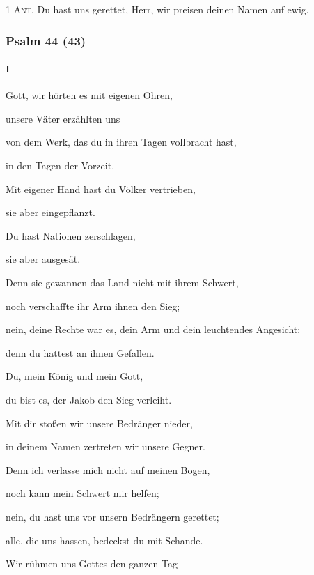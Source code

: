 \noindent \textsc{1 Ant.} Du hast uns gerettet, Herr, wir preisen deinen Namen auf ewig.

\subsubsection{Psalm 44 (43)} \paragraph{I}

\noindent Gott, wir hörten es mit eigenen Ohren,~\GreStar{}~\nopagebreak

unsere Väter erzählten uns

\noindent von dem Werk, das du in ihren Tagen vollbracht hast,~\GreStar{}~\nopagebreak

in den Tagen der Vorzeit.

\noindent Mit eigener Hand hast du Völker vertrieben,~\GreStar{}~\nopagebreak

sie aber eingepflanzt.

\noindent Du hast Nationen zerschlagen,~\GreStar{}~\nopagebreak

sie aber ausgesät.

\noindent Denn sie gewannen das Land nicht mit ihrem Schwert,~\GreStar{}~\nopagebreak

noch verschaffte ihr Arm ihnen den Sieg;

\noindent nein, deine Rechte war es, dein Arm und dein leuchtendes Angesicht;~\GreStar{}~\nopagebreak

denn du hattest an ihnen Gefallen.

\noindent Du, mein König und mein Gott,~\GreStar{}~\nopagebreak

du bist es, der Jakob den Sieg verleiht.

\noindent Mit dir stoßen wir unsere Bedränger nieder,~\GreStar{}~\nopagebreak

in deinem Namen zertreten wir unsere Gegner.

\noindent Denn ich verlasse mich nicht auf meinen Bogen,~\GreStar{}~\nopagebreak

noch kann mein Schwert mir helfen;

\noindent nein, du hast uns vor unsern Bedrängern gerettet;~\GreStar{}~\nopagebreak

alle, die uns hassen, bedeckst du mit Schande.

\noindent Wir rühmen uns Gottes den ganzen Tag~\GreStar{}~\nopagebreak

